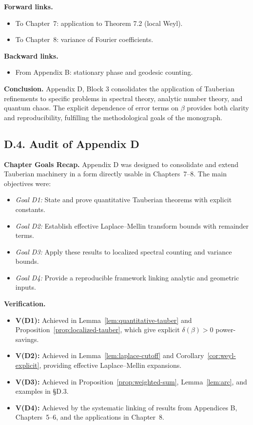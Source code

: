 \noindent \textbf{Forward links.}
\begin{itemize}
\item To Chapter~7: application to Theorem 7.2 (local Weyl).  
\item To Chapter~8: variance of Fourier coefficients.  
\end{itemize}

\noindent \textbf{Backward links.}
\begin{itemize}
\item From Appendix B: stationary phase and geodesic counting.  
\end{itemize}

\bigskip
\noindent \textbf{Conclusion.} Appendix D, Block 3 consolidates the application of Tauberian refinements to specific problems in spectral theory, analytic number theory, and quantum chaos.  
The explicit dependence of error terms on $\beta$ provides both clarity and reproducibility, fulfilling the methodological goals of the monograph.

\subsection*{D.4. Audit of Appendix D}

\noindent \textbf{Chapter Goals Recap.}  
Appendix D was designed to consolidate and extend Tauberian machinery in a form directly usable in Chapters~7--8.  
The main objectives were:

\begin{itemize}
\item \emph{Goal D1:} State and prove quantitative Tauberian theorems with explicit constants.  
\item \emph{Goal D2:} Establish effective Laplace–Mellin transform bounds with remainder terms.  
\item \emph{Goal D3:} Apply these results to localized spectral counting and variance bounds.  
\item \emph{Goal D4:} Provide a reproducible framework linking analytic and geometric inputs.  
\end{itemize}

\medskip

\noindent \textbf{Verification.}
\begin{itemize}
\item \textbf{V(D1):} Achieved in Lemma~\ref{lem:quantitative-tauber} and Proposition~\ref{prop:localized-tauber}, which give explicit $\delta(\beta)>0$ power-savings.  
\item \textbf{V(D2):} Achieved in Lemma~\ref{lem:laplace-cutoff} and Corollary~\ref{cor:weyl-explicit}, providing effective Laplace–Mellin expansions.  
\item \textbf{V(D3):} Achieved in Proposition~\ref{prop:weighted-sum}, Lemma~\ref{lem:arc}, and examples in \S D.3.  
\item \textbf{V(D4):} Achieved by the systematic linking of results from Appendices B, Chapters~5–6, and the applications in Chapter~8.  
\end{itemize}

